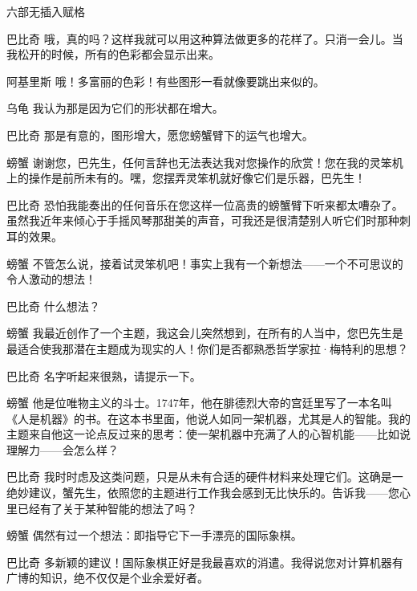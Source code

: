 \begin{dialog}{六部无插入赋格}
\begin{dialogue}
\item[巴比奇]哦，真的吗？这样我就可以用这种算法做更多的花样了。只消一会儿。当我松开的时候，所有的色彩都会显示出来。

\item[阿基里斯]哦！多富丽的色彩！有些图形一看就像要跳出来似的。

\item[乌龟]我认为那是因为它们的形状都在增大。

\item[巴比奇]那是有意的，图形增大，愿您螃蟹臂下的运气也增大。

\item[螃蟹]谢谢您，巴先生，任何言辞也无法表达我对您操作的欣赏！您在我的灵笨机上的操作是前所未有的。嘿，您摆弄灵笨机就好像它们是乐器，巴先生！

\item[巴比奇]恐怕我能奏出的任何音乐在您这样一位高贵的螃蟹臂下听来都太嘈杂了。虽然我近年来倾心于手摇风琴那甜美的声音，可我还是很清楚别人听它们时那种刺耳的效果。

\item[螃蟹]不管怎么说，接着试灵笨机吧！事实上我有一个新想法——一个不可思议的令人激动的想法！

\item[巴比奇]什么想法？

\item[螃蟹]我最近创作了一个主题，我这会儿突然想到，在所有的人当中，您巴先生是最适合使我那潜在主题成为现实的人！你们是否都熟悉哲学家拉·梅特利的思想？

\item[巴比奇]名字听起来很熟，请提示一下。

\item[螃蟹]他是位唯物主义的斗士。1747年，他在腓德烈大帝的宫廷里写了一本名叫《人是机器》的书。在这本书里面，他说人如同一架机器，尤其是人的智能。我的主题来自他这一论点反过来的思考：使一架机器中充满了人的心智机能——比如说理解力——会怎么样？

\item[巴比奇]我时时虑及这类问题，只是从未有合适的硬件材料来处理它们。这确是一绝妙建议，蟹先生，依照您的主题进行工作我会感到无比快乐的。告诉我——您心里已经有了关于某种智能的想法了吗？

\item[螃蟹]偶然有过一个想法：即指导它下一手漂亮的国际象棋。

\item[巴比奇]多新颖的建议！国际象棋正好是我最喜欢的消遣。我得说您对计算机器有广博的知识，绝不仅仅是个业余爱好者。


\end{dialogue}
\end{dialog}
